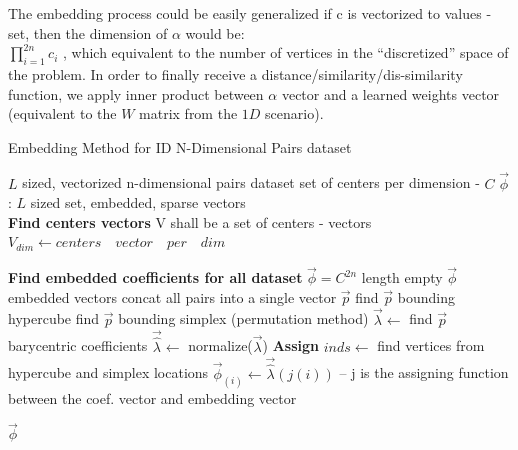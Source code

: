 	The embedding process could be easily generalized if c is vectorized to values - set, then the dimension of $\alpha$ would be:\\ 
	$\prod_{i=1}^{2n}c_i$ , which equivalent to the number of vertices in the “discretized” space of the problem.
	In order to finally receive a distance/similarity/dis-similarity function, we apply inner product between $\alpha$  vector and a learned weights vector (equivalent to the $W$ matrix from the $1D$ scenario).
	
	
	
	\begin{algorithm}
				\caption{Embedding Method for ID N-Dimensional Pairs dataset}
				\begin{algorithmic}
				 
				
				\REQUIRE $L$ sized, vectorized n-dimensional pairs dataset
				\REQUIRE set of centers per dimension - $C$
				\ENSURE $\overrightarrow{\phi}$: $L$ sized set, embedded, sparse vectors\\
				
				\STATE \textbf{Find centers vectors}
				\STATE V shall be a set of centers - vectors
				\STATE $V_{dim} \leftarrow centers \quad vector \quad per \quad dim$
				\ENDFOR
				
				\STATE \textbf{Find embedded coefficients for all dataset}
				\STATE $\overrightarrow{\phi} = C^{2n}$ length empty $\overrightarrow{\phi}$ embedded vectors
				\STATE concat all pairs into a single vector $\overrightarrow{p}$
				\STATE find $\overrightarrow{p}$ bounding hypercube 
				\STATE find $\overrightarrow{p}$ bounding simplex (permutation method)
				\STATE $\overrightarrow{\lambda} \leftarrow$ find $\overrightarrow{p}$ barycentric coefficients 
				\STATE $\overrightarrow{\hat{\lambda}} \leftarrow$ normalize($\overrightarrow{\lambda}$)
				\ENDFOR
				\STATE \textbf{Assign}
				\STATE $inds \leftarrow$ find vertices from hypercube and simplex locations
				\STATE $\overrightarrow{\phi}_{(i)} \leftarrow \overrightarrow{\hat{\lambda}}(j(i))$ -- j is the assigning function between the coef. vector and embedding vector
				\ENDFOR
				\ENDFOR
				
				\RETURN $\overrightarrow{\phi}$
	
				
				\end{algorithmic}
			\end{algorithm}
	
